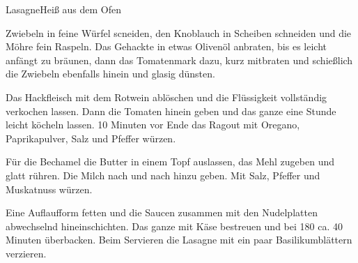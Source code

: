 \begin{recipe}{Lasagne}{Heiß aus dem Ofen}
  \label{Lasagne}



  \steps
  Zwiebeln in feine Würfel scneiden, den Knoblauch in Scheiben schneiden und die Möhre
  fein Raspeln. Das Gehackte in etwas Olivenöl anbraten, bis es leicht anfängt zu bräunen,
  dann das Tomatenmark dazu, kurz mitbraten und schießlich die Zwiebeln ebenfalls hinein
  und glasig dünsten.

  Das Hackfleisch mit dem Rotwein ablöschen und die Flüssigkeit vollständig verkochen
  lassen. Dann die Tomaten hinein geben und das ganze eine Stunde leicht köcheln lassen.
  10 Minuten vor Ende das Ragout mit Oregano, Paprikapulver, Salz und Pfeffer würzen.

  Für die Bechamel die Butter in einem Topf auslassen, das Mehl zugeben und glatt rühren.
  Die Milch nach und nach hinzu geben. Mit Salz, Pfeffer und Muskatnuss würzen.

  Eine Auflaufform fetten und die Saucen zusammen mit den Nudelplatten abwechselnd
  hineinschichten. Das ganze mit Käse bestreuen und bei 180 \celsius ca. 40 Minuten
  überbacken. Beim Servieren die Lasagne mit ein paar Basilikumblättern verzieren.

\end{recipe}
